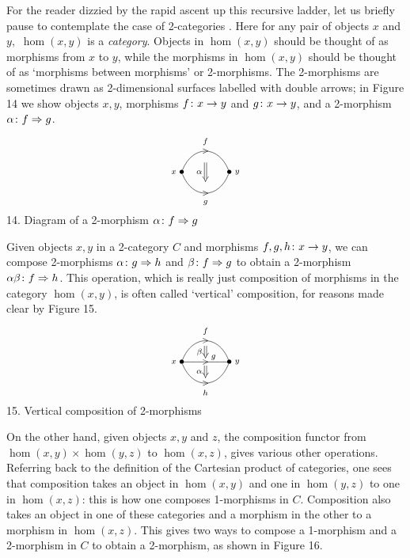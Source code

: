 For the reader dizzied by the rapid ascent up this recursive
ladder, let us briefly pause to contemplate the case of
2-categories \cite{KS}.  Here for any pair of objects $x$ and
$y,$ $\hom(x,y)$ is a {\it category}.  Objects in $\hom(x,y)$ should be
thought of as morphisms from $x$ to $y$, while the morphisms in
$\hom(x,y)$ should be thought of as `morphisms between morphisms'
or 2-morphisms.   The 2-morphisms are sometimes drawn as
2-dimensional surfaces labelled with double arrows; in Figure 14
we show objects $x,y$, morphisms $f\colon x \to y$ and $g\colon x
\to y$, and a 2-morphism $\alpha \colon f \Rightarrow g$.

\bfig
\[
 \xy 
  (-15,0)*{\bullet}="1"; %
  (0,0)*{\bullet}="2";
 "1";"2" **\crv{(-12,9) & (-3,9)};
  "1";"2" **\crv{(-12,-9) & (-3,-9)};
    (-7.5,6.75)*{\scriptstyle >}+(0,3)*{\scriptstyle f};
    (-7.5,-6.75)*{\scriptstyle >}+(0,-3)*{\scriptstyle g};
    (-17.5,0)*{\scriptstyle x};
  (2.5,0)*{\scriptstyle y};
  {\ar@{=>}_{\scriptstyle \alpha}(-7.5,3)*{};(-7.5,-3)*{}} ;
 \endxy
\]
14.  Diagram of a 2-morphism $\alpha \colon f \Rightarrow g$
\efig

Given objects $x,y$ in a 2-category $C$ and morphisms $f,g,h
\colon x \to y$, we can compose 2-morphisms $\alpha \colon g
\Rightarrow h$ and $\beta \colon f \Rightarrow g$ to obtain a
2-morphism $\alpha\beta \colon f \Rightarrow h$.  This operation,
which is really just composition of morphisms in the category
$\hom(x,y)$, is often called `vertical' composition, for reasons
made clear by Figure 15.

\bfig
\[
 \xy 
  (-15,0)*{\bullet}="1";
  (0,0)*{\bullet}="2";
 "1";"2" **\crv{(-12,9) & (-3,9)};
 "1";"2" **\crv{};
  "1";"2" **\crv{(-12,-9) & (-3,-9)};
    (-7.5,6.75)*{\scriptstyle >}+(0,3)*{\scriptstyle f};
    (-7.5,-6.75)*{\scriptstyle >}+(0,-3)*{\scriptstyle h};
    (-17.5,0)*{\scriptstyle x};
  (2.5,0)*{\scriptstyle y};
    (-7.5,0)*{\scriptstyle >}+(2.5,1.5)*{\scriptstyle g};
  {\ar@{=>}_{\scriptstyle \beta}(-7.5,5)*{};(-7.5,1.25)*{}} ;
  {\ar@{=>}_{\scriptstyle \alpha}(-7.5,-1.25)*{};(-7.5,-5)*{}} ;
 \endxy
\]
15.  Vertical composition of 2-morphisms
\efig

\noindent On the other hand, given objects $x,y$ and $z$, the
composition functor from $\hom(x,y) \times \hom(y,z)$ to
$\hom(x,z)$, gives various other operations.  Referring back to
the definition of the Cartesian product of categories,
one sees that composition takes an object in $\hom(x,y)$ and one
in $\hom(y,z)$ to one in $\hom(x,z)$: this is how one composes
1-morphisms in $C$.  Composition also takes an object in one of
these categories and a morphism in the other to a morphism in
$\hom(x,z)$.  This gives two ways to compose a 1-morphism and a
2-morphism in $C$ to obtain a 2-morphism, as shown in Figure 16.

